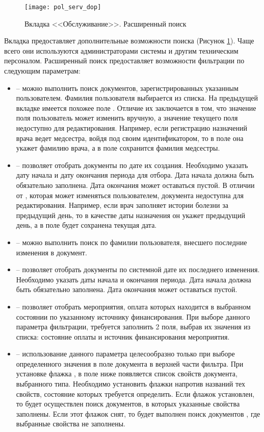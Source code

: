  \begin{figure}[ht]\centering
   \texttt{[image: pol\_serv\_dop]}
   \caption{Вкладка <<Обслуживание>>. Расширенный поиск}
   \label{img_pol_serv_dop}
 \end{figure}
 
Вкладка  предоставляет дополнительные возможности поиска (Рисунок \ref{img_pol_serv_dop}). Чаще всего они используются администраторами системы и другим техническим персоналом. Расширенный поиск предоставляет возможности фильтрации по следующим параметрам:
\begin{itemize}
 \item {} – можно выполнить поиск документов, зарегистрированных указанным пользователем. Фамилия пользователя выбирается из списка. На предыдущей вкладке имеется похожее поле .  Отличие их заключается в том, что значение поля  пользователь может изменить вручную, а значение текущего поля недоступно для редактирования. Например, если регистрацию назначений врача ведет медсестра, войдя под своим идентификатором, то в поле   она укажет фамилию врача, а в поле  сохранится фамилия медсестры.
 \item {} – позволяет отобрать документы по дате их создания. Необходимо указать дату начала и дату окончания периода для отбора. Дата начала должна быть обязательно заполнена. Дата окончания может оставаться пустой. В отличии от , которая может изменяться пользователем,  документа недоступна для редактирования. Например, если врач заполняет истории болезни за предыдущий день, то в качестве даты назначения он укажет предыдущий день, а в поле  будет сохранена текущая дата.
 \item {} – можно выполнить поиск по фамилии пользователя, внесшего последние изменения в документ.
 \item {} – позволяет отобрать документы по системной дате их последнего изменения. Необходимо указать даты начала и окончания периода. Дата начала должна быть обязательно заполнена. Дата окончания может оставаться пустой.
 \item {} – позволяет отобрать мероприятия, оплата которых находится в выбранном состоянии по указанному источнику финансирования. При выборе данного параметра фильтрации, требуется заполнить 2 поля, выбрав их значения из списка: состояние оплаты и источник финансирования мероприятия.
 \item {} – использование данного параметра целесообразно только при выборе определенного значения в поле  документа в верхней части фильтра. При установке флажка , в поле ниже появляется список свойств документа, выбранного типа. Необходимо установить флажки напротив названий тех свойств, состояние которых требуется определить. Если флажок  установлен, то будет осуществлен поиск документов, в которых указанные свойства заполнены. Если этот флажок снят, то будет выполнен поиск документов , где выбранные свойства не заполнены.
\end{itemize}
 
